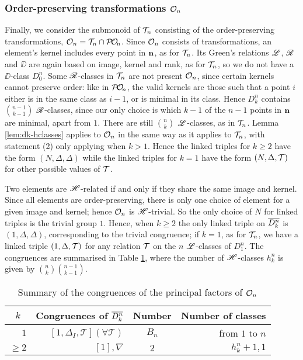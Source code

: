 \subsubsection{Order-preserving transformations $\mathcal{O}_n$}
\label{sec:princfact-on}
Finally, we consider the submonoid of $\mathcal{T}_n$ consisting of the order-preserving
transformations, $\mathcal{O}_n = \mathcal{T}_n \cap \mathcal{P\!O\!}_n$.  Since $\mathcal{O}_n$ consists of
transformations, an element's kernel includes every point in $\mathbf{n}$, as for
$\mathcal{T}_n$.  Its Green's relations $\mathrel{\mathscr{L}}$, $\mathrel{\mathscr{R}}$ and $\DD$ are again based on image,
kernel and rank, as for $\mathcal{T}_n$, so we do not have a $\DD$-class $D_0^n$.  Some
$\mathrel{\mathscr{R}}$-classes in $\mathcal{T}_n$ are not present $\mathcal{O}_n$, since certain kernels cannot
preserve order: like in $\mathcal{P\!O\!}_n$, the valid kernels are those such that a point
$i$ either is in the same class as $i-1$, or is minimal in its class.  Hence
$D_k^n$ contains $\binom{n-1}{k-1}$ $\mathrel{\mathscr{R}}$-classes, since our only choice is
which $k-1$ of the $n-1$ points in $\mathbf{n}$ are minimal, apart from $1$.  There are
still $\binom{n}{k}$ $\mathrel{\mathscr{L}}$-classes, as in $\mathcal{T}_n$.  Lemma \ref{lem:dk-hclasses}
applies to $\mathcal{O}_n$ in the same way as it applies to $\mathcal{T}_n$, with statement (2)
only applying when $k > 1$.  Hence the linked triples for $k \geq 2$ have the
form $(N, \Delta, \Delta)$ while the linked triples for $k=1$ have the form
$(N, \Delta, \mathcal{T})$ for other possible values of $\mathcal{T}$.

Two elements are $\mathrel{\mathscr{H}}$-related if and only if they share the same image and
kernel.  Since all elements are order-preserving, there is only one choice of
element for a given image and kernel; hence $\mathcal{O}_n$ is $\mathrel{\mathscr{H}}$-trivial.  So the
only choice of $N$ for linked triples is the trivial group $1$.  Hence, when
$k \geq 2$ the only linked triple on $\overline{D_k^n}$ is $(1, \Delta, \Delta)$,
corresponding to the trivial congruence; if $k = 1$, as for $\mathcal{T}_n$, we have a
linked triple $(1, \Delta, \mathcal{T})$ for any relation $\mathcal{T}$ on the $n$ $\mathrel{\mathscr{L}}$-classes
of $D_1^n$.  The congruences are summarised in Table \ref{tab:dkstar-congs-on},
where the number of $\mathrel{\mathscr{H}}$-classes $h_k^n$ is given by
$\binom{n}{k} \binom{n-1}{k-1}$.

\begin{table}[h]
  \centering
  \renewcommand{\arraystretch}{1.3}
  \begin{tabular}{| r | r | c | r |}
    \hline
    \multicolumn{1}{|c|}{$k$} & \multicolumn{1}{c|}{\textbf{Congruences of $\overline{D_k^n}$}} & \textbf{Number} & \multicolumn{1}{c|}{\textbf{Number of classes}} \\
    \hline
    $1$ & $[1, \Delta_I, \mathcal{T}] (\forall \mathcal{T})$ & $B_n$ & from $1$ to $n$ \\
    $\geq 2$
    & $[1], \nabla$
    & $2$
    & $h_k^n + 1, 1$ \\
    \hline
  \end{tabular}
  \caption{Summary of the congruences of the principal factors of $\mathcal{O}_n$}
  \label{tab:dkstar-congs-on}
\end{table}

